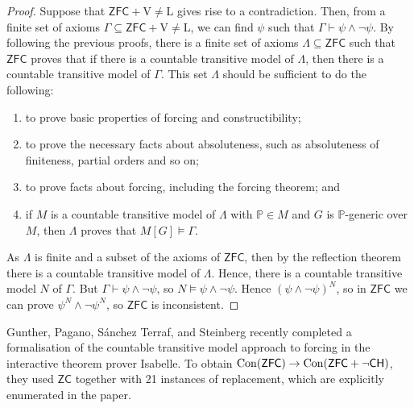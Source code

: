 \begin{proof}
    Suppose that \( \mathsf{ZFC} + \mathrm{V} \neq \mathrm{L} \) gives rise to a contradiction.
    Then, from a finite set of axioms \( \Gamma \subseteq \mathsf{ZFC} + \mathrm{V} \neq \mathrm{L} \), we can find \( \psi \) such that \( \Gamma \vdash \psi \wedge \neg \psi \).
    By following the previous proofs, there is a finite set of axioms \( \Lambda \subseteq \mathsf{ZFC} \) such that \( \mathsf{ZFC} \) proves that if there is a countable transitive model of \( \Lambda \), then there is a countable transitive model of \( \Gamma \).
    This set \( \Lambda \) should be sufficient to do the following:
    \begin{enumerate}
        \item to prove basic properties of forcing and constructibility;
        \item to prove the necessary facts about absoluteness, such as absoluteness of finiteness, partial orders and so on;
        \item to prove facts about forcing, including the forcing theorem; and
        \item if \( M \) is a countable transitive model of \( \Lambda \) with \( \mathbb P \in M \) and \( G \) is \( \mathbb P \)-generic over \( M \), then \( \Lambda \) proves that \( M[G] \vDash \Gamma \).
    \end{enumerate}
    As \( \Lambda \) is finite and a subset of the axioms of \( \mathsf{ZFC} \), then by the reflection theorem there is a countable transitive model of \( \Lambda \).
    Hence, there is a countable transitive model \( N \) of \( \Gamma \).
    But \( \Gamma \vdash \psi \wedge \neg\psi \), so \( N \vDash \psi \wedge \neg\psi \).
    Hence \( (\psi \wedge \neg\psi)^N \), so in \( \mathsf{ZFC} \) we can prove \( \psi^N \wedge \neg\psi^N \), so \( \mathsf{ZFC} \) is inconsistent.
\end{proof}
\begin{remark}
    Gunther, Pagano, S\'anchez Terraf, and Steinberg recently completed a formalisation of the countable transitive model approach to forcing in the interactive theorem prover Isabelle.
    To obtain \( \operatorname{Con}(\mathsf{ZFC}) \to \operatorname{Con}(\mathsf{ZFC} + \neg\mathsf{CH}) \), they used \( \mathsf{ZC} \) together with 21 instances of replacement, which are explicitly enumerated in the paper.
\end{remark}

